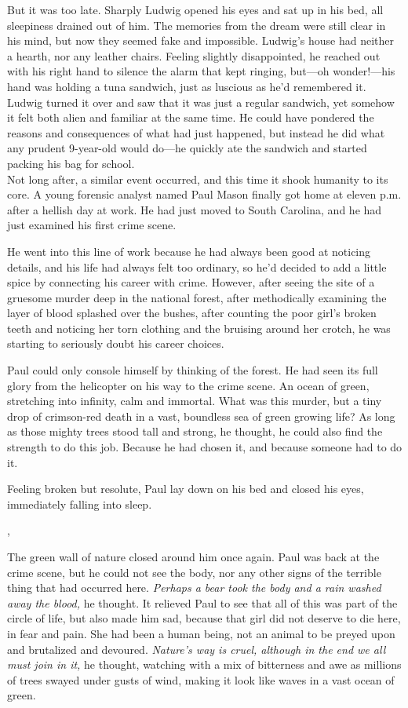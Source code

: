 \documentclass[openany, oneside]{book}
\begin{document}
But it was too late.
Sharply Ludwig opened his eyes and sat up in his bed, all sleepiness drained out of him.
The memories from the dream were still clear in his mind, but now they seemed fake and impossible.
Ludwig's house had neither a hearth, nor any leather chairs.
Feeling slightly disappointed, he reached out with his right hand to silence the alarm that kept ringing, but---oh wonder!---his hand was holding a tuna sandwich, just as luscious as he'd remembered it.
Ludwig turned it over and saw that it was just a regular sandwich, yet somehow it felt both alien and familiar at the same time.
He could have pondered the reasons and consequences of what had just happened, but instead he did what any prudent 9-year-old would do---he quickly ate the sandwich and started packing his bag for school.\\

Not long after, a similar event occurred, and this time it shook humanity to its core.
A young forensic analyst named Paul Mason finally got home at eleven p.m. after a hellish day at work.
He had just moved to South Carolina, and he had just examined his first crime scene.

He went into this line of work because he had always been good at noticing details, and his life had always felt too ordinary, so he'd decided to add a little spice by connecting his career with crime.
However, after seeing the site of a gruesome murder deep in the national forest, after methodically examining the layer of blood splashed over the bushes, after counting the poor girl's broken teeth and noticing her torn clothing and the bruising around her crotch, he was starting to seriously doubt his career choices.

Paul could only console himself by thinking of the forest.
He had seen its full glory from the helicopter on his way to the crime scene.
An ocean of green, stretching into infinity, calm and immortal.
What was this murder, but a tiny drop of crimson-red death in a vast, boundless sea of green growing life?
As long as those mighty trees stood tall and strong, he thought, he could also find the strength to do this job.
Because he had chosen it, and because someone had to do it.

Feeling broken but resolute, Paul lay down on his bed and closed his eyes, immediately falling into sleep.

\sep

The green wall of nature closed around him once again.
Paul was back at the crime scene, but he could not see the body, nor any other signs of the terrible thing that had occurred here.
\emph{Perhaps a bear took the body and a rain washed away the blood,} he thought.
It relieved Paul to see that all of this was part of the circle of life, but also made him sad, because that girl did not deserve to die here, in fear and pain.
She had been a human being, not an animal to be preyed upon and brutalized and devoured.
\emph{Nature's way is cruel, although in the end we all must join in it,} he thought, watching with a mix of bitterness and awe as millions of trees swayed under gusts of wind, making it look like waves in a vast ocean of green.
\end{document}
